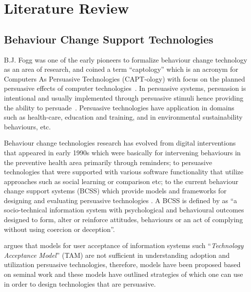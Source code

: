 
\chapter{Literature Review} %

\label{literaturereview} %


\section{Behaviour Change Support Technologies}
B.J. Fogg was one of the early pioneers to formalize behaviour change technology as an area of research, and coined a term “captology” which is an acronym for Computers As Persuasive Technologies (CAPT-ology) with focus on the planned persuasive effects of computer technologies~\citep{fogg1999persuasive}. In persuasive systems, persuasion is intentional and usually implemented through persuasive stimuli hence providing the ability to persuade~\citep{hamari2014persuasive}. Persuasive technologies have application in domains such as health-care, education and training, and in environmental sustainability behaviours, etc.

Behaviour change technologies research has evolved from digital interventions that appeared in early 1990s which were basically for intervening behaviours in the preventive health area primarily through reminders; to persuasive technologies that were supported with various software functionality that utilize approaches such as social learning or comparison etc; to the current behaviour change support systems (BCSS) which provide models and frameworks for designing and evaluating persuasive technologies \citep{langrial2012digital}. A BCSS is defined by \cite{Oinas-Kukkonen:foundation}  as ``a socio-technical information system with psychological and behavioural outcomes designed to form, alter or reinforce attitudes, behaviours or an act of complying without using coercion or deception''.

\cite{Oinas-kukkonen:psd} argues that models for user acceptance of information systems such ``\emph{Technology Acceptance Model}'' (TAM) are not sufficient in understanding adoption and utilization persuasive technologies, therefore, models have been proposed based on seminal work and these models have outlined strategies of which one can use in order to design technologies that are persuasive.  

